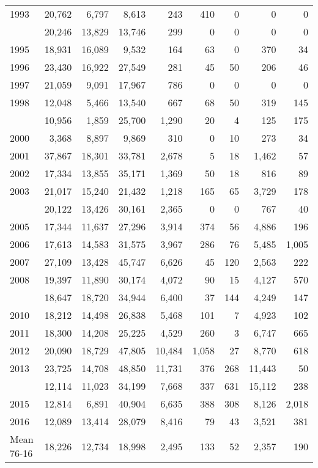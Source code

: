 \documentclass[]{article}
\begin{document}
\begin{table}
\begin{tabular}[t]{lrrrrrrrr}
1993 & 20,762 & 6,797 & 8,613 & 243 & 410 & 0 & 0 & 0\\
\addlinespace
1994 & 20,246 & 13,829 & 13,746 & 299 & 0 & 0 & 0 & 0\\
1995 & 18,931 & 16,089 & 9,532 & 164 & 63 & 0 & 370 & 34\\
1996 & 23,430 & 16,922 & 27,549 & 281 & 45 & 50 & 206 & 46\\
1997 & 21,059 & 9,091 & 17,967 & 786 & 0 & 0 & 0 & 0\\
1998 & 12,048 & 5,466 & 13,540 & 667 & 68 & 50 & 319 & 145\\
\addlinespace
1999 & 10,956 & 1,859 & 25,700 & 1,290 & 20 & 4 & 125 & 175\\
2000 & 3,368 & 8,897 & 9,869 & 310 & 0 & 10 & 273 & 34\\
2001 & 37,867 & 18,301 & 33,781 & 2,678 & 5 & 18 & 1,462 & 57\\
2002 & 17,334 & 13,855 & 35,171 & 1,369 & 50 & 18 & 816 & 89\\
2003 & 21,017 & 15,240 & 21,432 & 1,218 & 165 & 65 & 3,729 & 178\\
\addlinespace
2004 & 20,122 & 13,426 & 30,161 & 2,365 & 0 & 0 & 767 & 40\\
2005 & 17,344 & 11,637 & 27,296 & 3,914 & 374 & 56 & 4,886 & 196\\
2006 & 17,613 & 14,583 & 31,575 & 3,967 & 286 & 76 & 5,485 & 1,005\\
2007 & 27,109 & 13,428 & 45,747 & 6,626 & 45 & 120 & 2,563 & 222\\
2008 & 19,397 & 11,890 & 30,174 & 4,072 & 90 & 15 & 4,127 & 570\\
\addlinespace
2009 & 18,647 & 18,720 & 34,944 & 6,400 & 37 & 144 & 4,249 & 147\\
2010 & 18,212 & 14,498 & 26,838 & 5,468 & 101 & 7 & 4,923 & 102\\
2011 & 18,300 & 14,208 & 25,225 & 4,529 & 260 & 3 & 6,747 & 665\\
2012 & 20,090 & 18,729 & 47,805 & 10,484 & 1,058 & 27 & 8,770 & 618\\
2013 & 23,725 & 14,708 & 48,850 & 11,731 & 376 & 268 & 11,443 & 50\\
\addlinespace
2014 & 12,114 & 11,023 & 34,199 & 7,668 & 337 & 631 & 15,112 & 238\\
2015 & 12,814 & 6,891 & 40,904 & 6,635 & 388 & 308 & 8,126 & 2,018\\
2016 & 12,089 & 13,414 & 28,079 & 8,416 & 79 & 43 & 3,521 & 381\\
\rowcolor{yellow}%
Mean 76-16 & 18,226 & 12,734 & 18,998 & 2,495 & 133 & 52 & 2,357 & 190\\
\bottomrule
\end{tabular}
\end{table}
\end{document}

